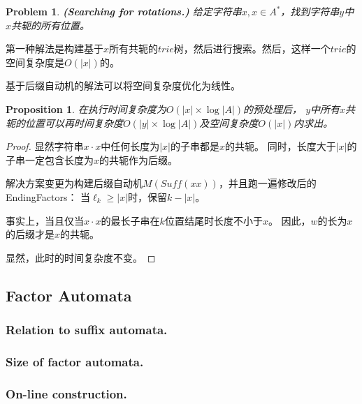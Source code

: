 \documentclass[UTF8]{ctexart}
\newtheorem{prop}[thm]{Proposition}
\newtheorem{prob}[thm]{Problem}
\theoremstyle{definition}
\theoremstyle{remark}
\numberwithin{equation}{subsection}
\newcommand{\Emph}{\textbf}
\newcommand{\Suff}{\textit{Suff}}
\begin{document}
	\begin{prob}
		\Emph{(Searching for rotations.)}
		给定字符串$x, x \in A^*$，找到字符串$y$中$x$共轭的所有位置。
	\end{prob}
	
	第一种解法是构建基于$x$所有共轭的$trie$树，然后进行搜索。然后，这样一个$trie$的空间复杂度是$O(|x|)$的。
	
	基于后缀自动机的解法可以将空间复杂度优化为线性。
	
	\begin{prop}
		在执行时间复杂度为$O(|x| \times \log |A|)$的预处理后，
		$y$中所有$x$共轭的位置可以再时间复杂度$O(|y| \times \log |A|)$及空间复杂度$O(|x|)$内求出。
	\end{prop}
	\begin{proof}
		显然字符串$x \cdot x$中任何长度为$|x|$的子串都是$x$的共轭。
		同时，长度大于$|x|$的子串一定包含长度为$x$的共轭作为后缀。
		
		解决方案变更为构建后缀自动机$M(\Suff(xx))$，并且跑一遍修改后的EndingFactors：
		当$\ell_k \ge |x|$时，保留$k - |x|$。
		
		事实上，当且仅当$x \cdot x$的最长子串在$k$位置结尾时长度不小于$x$。
		因此，$w$的长为$x$的后缀才是$x$的共轭。
		
		显然，此时的时间复杂度不变。
	\end{proof}
	
\subsection{Factor Automata}	
\label{sub:factor_automata}
	
\subsubsection{Relation to suffix automata.}

\subsubsection{Size of factor automata.}

\subsubsection{On-line construction.}
	
	
\end{document}
